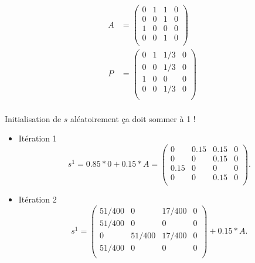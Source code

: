 \documentclass{article}
\theoremstyle{plain}%
\theoremstyle{definition}
\theoremstyle{remark}
\begin{document}
\begin{align*}
    A &= \begin{pmatrix}
        0 & 1 & 1 & 0 \\
        0 & 0 & 1 & 0 \\
        1 & 0 & 0 & 0 \\
        0 & 0 & 1 & 0 \\
    \end{pmatrix} \\

    P &= \begin{pmatrix}
        0 & 1 & 1/3 & 0 \\
        0 & 0 & 1/3 & 0 \\
        1 & 0 & 0   & 0 \\
        0 & 0 & 1/3 & 0 \\
    \end{pmatrix} \\
    
\end{align*}

Initialisation de $ s $ aléatoirement ça doit sommer à 1 ! 

\begin{itemize}
    \item Itération 1
    \[
        s^1 = 0.85 * 0 + 0.15 * A = \begin{pmatrix}
            0 & 0.15 & 0.15 & 0 \\
            0 & 0 & 0.15 & 0 \\
            0.15 & 0 & 0 & 0 \\
            0 & 0 & 0.15 & 0 \\
        \end{pmatrix}
    .\]
     \item Itération 2 
     \[
        s^1 = \begin{pmatrix}
            51/400 & 0 & 17/400 & 0 \\
            51/400 & 0 & 0 & 0 \\
            0 & 51/400 & 17/400 & 0 \\
            51/400 & 0 & 0 & 0 \\
        \end{pmatrix} + 0.15 * A
     .\]
     
\end{itemize}
\end{document}
